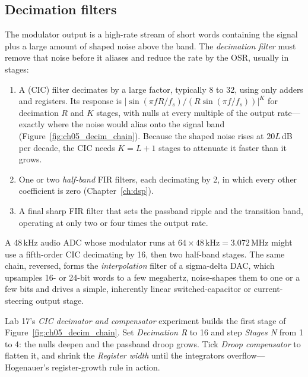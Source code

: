 \subsection{Decimation filters}
\label{sec:ch05:decim}

The modulator output is a high-rate stream of short words containing the signal plus a large
amount of shaped noise above the band. The \emph{decimation filter} must remove that noise before
it aliases and reduce the rate by the OSR, usually in stages:
\begin{enumerate}
\item A  (CIC) filter decimates by a large factor, typically 8 to
32, using only adders and registers. Its response is $\big|\sin(\pi fR/f_s)/(R\sin(\pi f/f_s))\big|^K$
for decimation $R$ and $K$ stages, with nulls at every multiple of the output rate---exactly
where the noise would alias onto the signal band (Figure~\ref{fig:ch05_decim_chain}). Because the
shaped noise rises at $20L$\,dB per decade, the CIC needs $K=L+1$ stages to attenuate it faster
than it grows.
\item One or two \emph{half-band} FIR filters, each decimating by 2, in which every other
coefficient is zero (Chapter~\ref{ch:dsp}).
\item A final sharp FIR filter that sets the passband ripple and the transition band,
operating at only two or four times the output rate.
\end{enumerate}
A 48\,kHz audio ADC whose modulator runs at $64\times48\,\text{kHz}=3.072$\,MHz might use a
fifth-order CIC decimating by 16, then two half-band stages. The same chain, reversed, forms the
\emph{interpolation} filter of a sigma-delta DAC, which upsamples 16- or 24-bit words to a few
megahertz, noise-shapes them to one or a few bits and drives a simple, inherently linear
switched-capacitor or current-steering output stage.

\begin{tryit}
Lab 17's \emph{CIC decimator and compensator} experiment builds the first stage of
Figure~\ref{fig:ch05_decim_chain}. Set \emph{Decimation R} to 16 and step \emph{Stages N} from 1 to
4: the nulls deepen and the passband droop grows. Tick \emph{Droop compensator} to flatten it, and
shrink the \emph{Register width} until the integrators overflow---Hogenauer's register-growth rule
in action.
\end{tryit}



